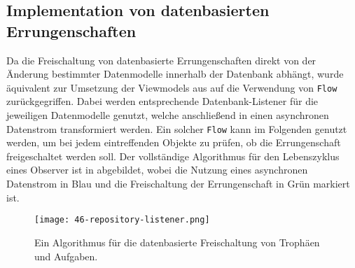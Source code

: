 \subsection{Implementation von datenbasierten Errungenschaften}\label{subsection:gamification-repository-listener}

Da die Freischaltung von datenbasierte Errungenschaften direkt von der Änderung bestimmter Datenmodelle innerhalb der Datenbank abhängt, wurde äquivalent zur Umsetzung der Viewmodels aus  auf die Verwendung von \texttt{Flow} zurückgegriffen. Dabei werden entsprechende Datenbank-Listener für die jeweiligen Datenmodelle genutzt, welche anschließend in einen asynchronen Datenstrom transformiert werden. Ein solcher \texttt{Flow} kann im Folgenden genutzt werden, um bei jedem eintreffenden Objekte zu prüfen, ob die Errungenschaft freigeschaltet werden soll. Der vollständige Algorithmus für den Lebenszyklus eines Observer ist in  abgebildet, wobei die Nutzung eines asynchronen Datenstrom in Blau und die Freischaltung der Errungenschaft in Grün markiert ist.  

\begin{figure}[H]
    \texttt{[image: 46-repository-listener.png]}
    \caption{Ein Algorithmus für die datenbasierte Freischaltung von Trophäen und Aufgaben.}\label{fig:repository-listener}
\end{figure}

